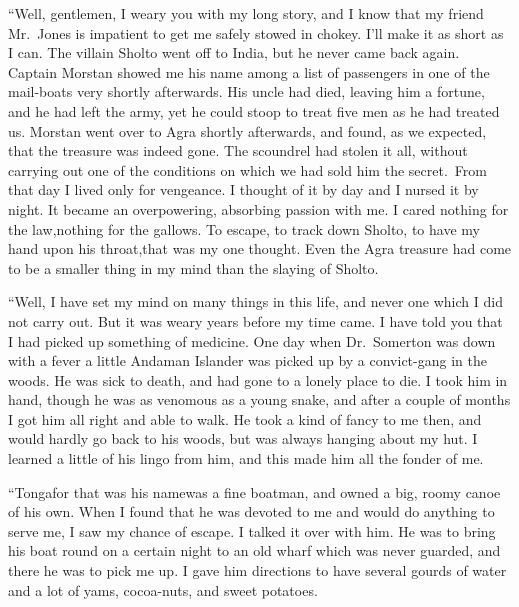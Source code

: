 \documentclass[12pt,english,oneside]{book}
\begin{document}
{}``Well, gentlemen, I weary you with my long story, and I know that
my friend Mr.\ Jones is impatient to get me safely stowed in chokey.
I'll make it as short as I can. The villain Sholto went off to India,
but he never came back again. Captain Morstan showed me his name among
a list of passengers in one of the mail-boats very shortly afterwards.
His uncle had died, leaving him a fortune, and he had left the army,
yet he could stoop to treat five men as he had treated us. Morstan
went over to Agra shortly afterwards, and found, as we expected, that
the treasure was indeed gone. The scoundrel had stolen it all, without
carrying out one of the conditions on which we had sold him the secret.\ 
From that day I lived only for vengeance. I thought of it by day and
I nursed it by night. It became an overpowering, absorbing passion
with me. I cared nothing for the law,\mdsh{---}nothing for the gallows.
To escape, to track down Sholto, to have my hand upon his throat,\mdsh{---}that
was my one thought. Even the Agra treasure had come to be a smaller
thing in my mind than the slaying of Sholto.

{}``Well, I have set my mind on many things in this life, and never
one which I did not carry out. But it was weary years before my time
came. I have told you that I had picked up something of medicine.
One day when Dr.\ Somerton was down with a fever a little Andaman
Islander was picked up by a convict-gang in the woods. He was sick
to death, and had gone to a lonely place to die. I took him in hand,
though he was as venomous as a young snake, and after a couple of
months I got him all right and able to walk. He took a kind of fancy
to me then, and would hardly go back to his woods, but was always
hanging about my hut. I learned a little of his lingo from him, and
this made him all the fonder of me.

{}``Tonga\mdsh{---}for that was his name\mdsh{---}was a fine boatman,
and owned a big, roomy canoe of his own. When I found that he was
devoted to me and would do anything to serve me, I saw my chance of
escape. I talked it over with him. He was to bring his boat round
on a certain night to an old wharf which was never guarded, and there
he was to pick me up. I gave him directions to have several gourds
of water and a lot of yams, cocoa-nuts, and sweet potatoes.
\end{document}
